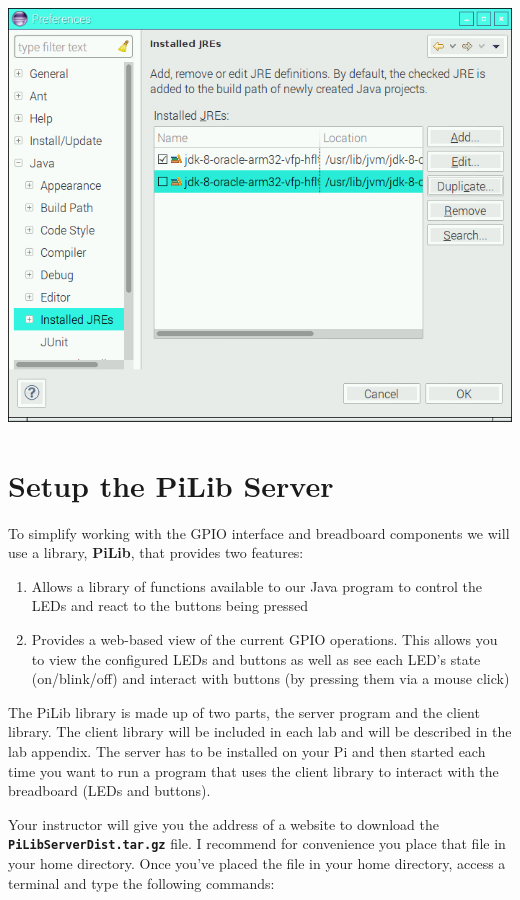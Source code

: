 \beforefig
\centerline{\includegraphics[height=2.5 in]{pi_images/setup/ConfigureEclipse7.jpg}}
\afterfig

\fi %


\section{Setup the PiLib Server}\label{setupPiLibServer}


To simplify working with the GPIO interface and breadboard components we will use a library, \textbf{PiLib}, that provides two features:


\begin{enumerate}
	\item Allows a library of functions available to our Java program to control the LEDs and react to the buttons being pressed
	\item Provides a web-based view of the current GPIO operations. This allows you to view the configured LEDs and buttons as well as see each LED's state (on/blink/off) and interact with buttons (by pressing them via a mouse click) 
\end{enumerate}

The PiLib library is made up of two parts, the server program and the client library. The client library will be included in each lab and will be described in the lab appendix. The server has to be installed on your Pi and then started each time you want to run a program that uses the client library to interact with the breadboard (LEDs and buttons).

Your instructor will give you the address of a website to download the \textbf{\texttt{PiLibServerDist.tar.gz}} file. I recommend for convenience you place that file in your home directory. Once you've placed the file in your home directory, access a terminal and type the following commands:

